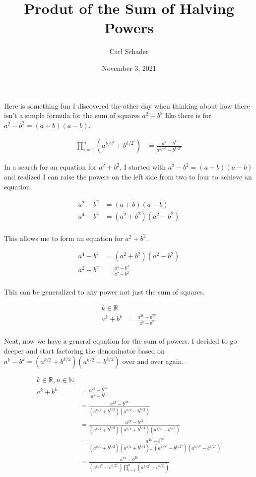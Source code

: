 \documentclass{article}
\title{Produt of the Sum of Halving Powers}
\author{Carl Schader}
\date{November 3, 2021}
\begin{document}
\maketitle

Here is something fun I discovered the other day when thinking about how there isn't a simple formula for the sum of squares $a^2 + b^2$ like there is for $a^2 - b^2 = (a+b)(a-b)$.

\begin{align*}
    \prod_{i=1}^{n}{\left(a^{k/{2^i}} + b^{k/{2^i}}\right)} &= \frac{a^k - b^k}{a^{k/{2^n}}-b^{k/{2^n}}}
\end{align*}

In a search for an equation for $a^2+b^2$, I started with $a^2-b^2=(a+b)(a-b)$ and realized I can raise the powers on the left side from two to four to achieve an equation.

\begin{align*}
    a^2-b^2 &= (a+b)(a-b)\\
    a^4-b^4 &= (a^2+b^2)(a^2-b^2)\\
\end{align*}

This allows me to form an equation for $a^2+b^2$.

\begin{align*}
    a^4-b^4 &= (a^2+b^2)(a^2-b^2)\\
    a^2+b^2 &= \frac{a^4-b^4}{a^2-b^2}\\
\end{align*}

This can be generalized to any power not just the sum of squares.

\begin{align*}
    k\in\mathbb{R}\\
    a^k+b^k &= \frac{a^{2k}-b^{2k}}{a^k-b^k}\\
\end{align*}

\newpage

Neat, now we have a general equation for the sum of powers. I decided to go deeper and start factoring the denominator based on \\$a^k-b^k=(a^{k/2}+b^{k/2})(a^{k/2}-b^{k/2})$ over and over again.

\begin{align*}
    k\in\mathbb{R}, n\in\mathbb{N}\\
    a^k+b^k &= \frac{a^{2k}-b^{2k}}{a^k-b^k}\\
    &= \frac{a^{2k}-b^{2k}}{(a^{k/2}+b^{k/2})(a^{k/2}-b^{k/2})}\\
    &= \frac{a^{2k}-b^{2k}}{(a^{k/2}+b^{k/2})(a^{k/4}+b^{k/4})(a^{k/4}-b^{k/4})}\\
    &= \frac{a^{2k}-b^{2k}}{(a^{k/2}+b^{k/2})(a^{k/4}+b^{k/4})\dots(a^{k/{2^n}}+b^{k/{2^n}})(a^{k/{2^n}}-b^{k/{2^n}})}\\
    &= \frac{a^{2k}-b^{2k}}{(a^{k/{2^n}}-b^{k/{2^n}})\prod_{i=1}^{n}{\left(a^{k/{2^i}} + b^{k/{2^i}}\right)}}\\
\end{align*}
\end{document}
